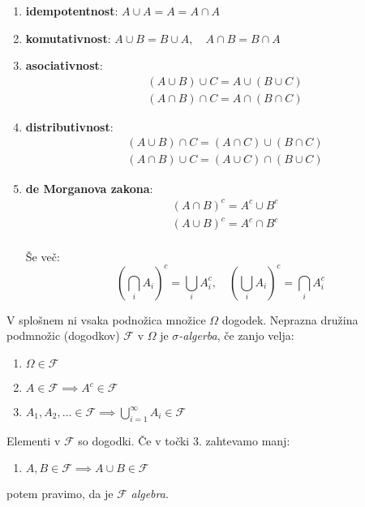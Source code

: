 \documentclass[12pt]{book}
\def\n{\noindent}
\def\s{\vspace{10pt}}
\theoremstyle{definition}
\theoremstyle{plain}
\theoremstyle{plain}
\theoremstyle{plain}
\theoremstyle{remark}
\begin{document}
\begin{enumerate}
    \item \textbf{idempotentnost}: $A \cup A=A=A \cap A$
    \item \textbf{komutativnost}: $A \cup B=B \cup A, \quad A \cap B=B \cap A$
    \item \textbf{asociativnost}: $$\begin{aligned} & (A \cup B) \cup C=A \cup(B \cup C) \\ & (A \cap B) \cap C=A \cap(B \cap C)\end{aligned}$$
    \item \textbf{distributivnost}: $$\begin{aligned} & (A \cup B) \cap C=(A \cap C) \cup(B \cap C) \\ & (A \cap B) \cup C=(A \cup C) \cap(B \cup C)\end{aligned}$$
    \item \textbf{de Morganova zakona}: $$\begin{aligned} & (A \cap B)^c=A^c \cup B^c \\ & (A \cup B)^c=A^c \cap B^c\end{aligned}$$ \\ Še več: $$ \left(\bigcap_i A_i\right)^c=\bigcup_i A_i^c, \quad \left(\bigcup_i A_i\right)^c=\bigcap_i A_i^c$$
\end{enumerate}

\n V splošnem ni vsaka podnožica množice $\Omega$ dogodek. Neprazna družina podmnožic (dogodkov) $\mathcal{F}$ v $\Omega$ je \emph{$\sigma$-algerba}, če zanjo velja: 

\begin{enumerate}
    \item $\Omega \in \mathcal{F}$
    \item $A \in \mathcal{F} \implies A^c \in \mathcal{F}$
    \item $A_1, A_2, \ldots \in \mathcal{F} \implies \bigcup_{i=1}^{\infty} A_i \in \mathcal{F}$
\end{enumerate}

\n Elementi v $\mathcal{F}$ so dogodki. Če v točki 3. zahtevamo manj: 

\begin{enumerate}[start=3,label={\arabic*.*}]
    \item $A, B \in \mathcal{F} \implies A \cup B \in \mathcal{F}$
\end{enumerate}

potem pravimo, da je $\mathcal{F}$ \emph{algebra}. \s
\end{document}
